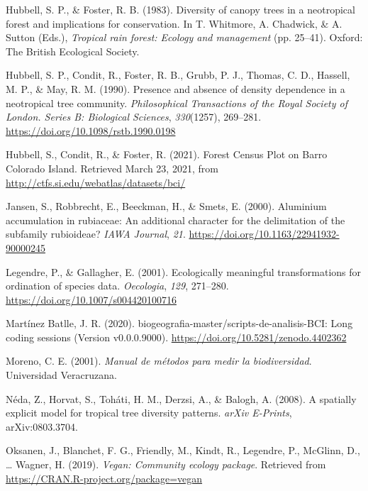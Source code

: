 \documentclass[11pt,]{article}
\begin{document}
\hypertarget{ref-hubell_foster_1983}{}
Hubbell, S. P., \& Foster, R. B. (1983). Diversity of canopy trees in a
neotropical forest and implications for conservation. In T. Whitmore, A.
Chadwick, \& A. Sutton (Eds.), \emph{Tropical rain forest: Ecology and
management} (pp. 25--41). Oxford: The British Ecological Society.

\hypertarget{ref-hubell_et_all_1990}{}
Hubbell, S. P., Condit, R., Foster, R. B., Grubb, P. J., Thomas, C. D.,
Hassell, M. P., \& May, R. M. (1990). Presence and absence of density
dependence in a neotropical tree community. \emph{Philosophical
Transactions of the Royal Society of London. Series B: Biological
Sciences}, \emph{330}(1257), 269--281.
\url{https://doi.org/10.1098/rstb.1990.0198}

\hypertarget{ref-web_bci}{}
Hubbell, S., Condit, R., \& Foster, R. (2021). Forest Census Plot on
Barro Colorado Island. Retrieved March 23, 2021, from
\url{http://ctfs.si.edu/webatlas/datasets/bci/}

\hypertarget{ref-article}{}
Jansen, S., Robbrecht, E., Beeckman, H., \& Smets, E. (2000). Aluminium
accumulation in rubiaceae: An additional character for the delimitation
of the subfamily rubioideae? \emph{IAWA Journal}, \emph{21}.
\url{https://doi.org/10.1163/22941932-90000245}

\hypertarget{ref-legendre_galllagher_2001}{}
Legendre, P., \& Gallagher, E. (2001). Ecologically meaningful
transformations for ordination of species data. \emph{Oecologia},
\emph{129}, 271--280. \url{https://doi.org/10.1007/s004420100716}

\hypertarget{ref-jose_ramon_martinez_batlle_2020_4402362}{}
Martínez Batlle, J. R. (2020).
biogeografia-master/scripts-de-analisis-BCI: Long coding sessions
(Version v0.0.0.9000). \url{https://doi.org/10.5281/zenodo.4402362}

\hypertarget{ref-moreno2001manual}{}
Moreno, C. E. (2001). \emph{Manual de métodos para medir la
biodiversidad}. Universidad Veracruzana.

\hypertarget{ref-2008arXiv0803.3704N}{}
Néda, Z., Horvat, S., Toháti, H. M., Derzsi, A., \& Balogh, A. (2008). A
spatially explicit model for tropical tree diversity patterns.
\emph{arXiv E-Prints}, arXiv:0803.3704.

\hypertarget{ref-cita_vegan}{}
Oksanen, J., Blanchet, F. G., Friendly, M., Kindt, R., Legendre, P.,
McGlinn, D., \ldots{} Wagner, H. (2019). \emph{Vegan: Community ecology
package}. Retrieved from \url{https://CRAN.R-project.org/package=vegan}
\end{document}
